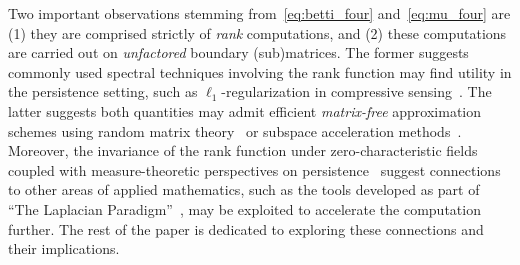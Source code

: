 \documentclass[10pt]{article}
\numberwithin{equation}{section}
\newcommand{\+}{%
	\raisebox{0.18ex}{\scaleobj{0.55}{+}}
}
\theoremstyle{definition}
\theoremstyle{definition}
\begin{document}
Two important observations stemming from~\eqref{eq:betti_four} and~\eqref{eq:mu_four} are (1) they are comprised strictly of \emph{rank} computations, and (2) these computations are carried out on \emph{unfactored} boundary (sub)matrices.
The former suggests commonly used spectral techniques involving the rank function may find utility in the persistence setting, such as $\ell_1$-regularization in compressive sensing~\cite{zhao2012approximation}. The latter suggests both quantities may admit efficient  \emph{matrix-free} approximation schemes using random matrix theory~\cite{chen2011output} or  subspace acceleration methods~\cite{golub2013matrix, parlett1994we}. 
Moreover, the invariance of the rank function under zero-characteristic fields coupled with measure-theoretic perspectives on persistence~\cite{chazal2016structure} suggest connections to other areas of applied mathematics, such as the tools developed as part of ``The Laplacian Paradigm''~\cite{}, may be exploited to accelerate the computation further. 
The rest of the paper is dedicated to exploring these connections and their implications. 
\end{document}
